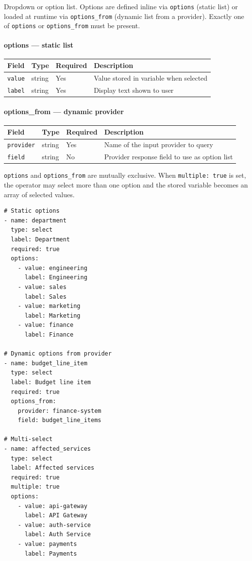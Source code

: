 Dropdown or option list.  Options are defined inline via \texttt{options}
(static list) or loaded at runtime via \texttt{options\_from} (dynamic list
from a provider).  Exactly one of \texttt{options} or \texttt{options\_from}
must be present.

\paragraph{options — static list}

\begin{center}
\begin{tabular}{lllp{5cm}}
\hline
\textbf{Field} & \textbf{Type} & \textbf{Required} & \textbf{Description} \\
\hline
\texttt{value} & string & Yes & Value stored in variable when selected \\
\texttt{label} & string & Yes & Display text shown to user \\
\hline
\end{tabular}
\end{center}

\paragraph{options\_from — dynamic provider}

\begin{center}
\begin{tabular}{lllp{5cm}}
\hline
\textbf{Field} & \textbf{Type} & \textbf{Required} & \textbf{Description} \\
\hline
\texttt{provider} & string & Yes & Name of the input provider to query \\
\texttt{field}    & string & No  & Provider response field to use as option list \\
\hline
\end{tabular}
\end{center}

\texttt{options} and \texttt{options\_from} are mutually exclusive.  When
\texttt{multiple: true} is set, the operator may select more than one option
and the stored variable becomes an array of selected values.

\begin{verbatim}
# Static options
- name: department
  type: select
  label: Department
  required: true
  options:
    - value: engineering
      label: Engineering
    - value: sales
      label: Sales
    - value: marketing
      label: Marketing
    - value: finance
      label: Finance

# Dynamic options from provider
- name: budget_line_item
  type: select
  label: Budget line item
  required: true
  options_from:
    provider: finance-system
    field: budget_line_items

# Multi-select
- name: affected_services
  type: select
  label: Affected services
  required: true
  multiple: true
  options:
    - value: api-gateway
      label: API Gateway
    - value: auth-service
      label: Auth Service
    - value: payments
      label: Payments
\end{verbatim}

